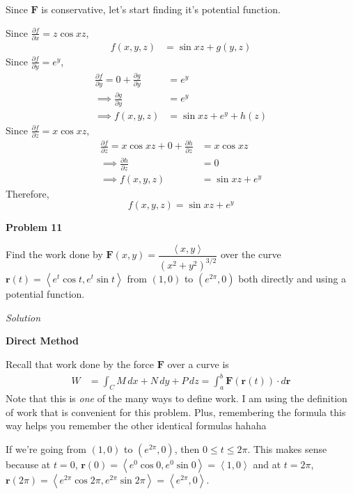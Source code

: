 \documentclass{article}
\newcommand{\lrp}[1]{\left( #1 \right)}
\newcommand{\lra}[1]{\left\langle #1 \right\rangle}
\renewcommand{\r}[0]{\mathbf{r}}
\newcommand{\F}[0]{\mathbf{F}}
\newcommand{\Solution}{\textit{Solution}}
\begin{document}
Since $\F$ is conservative, let's start finding it's potential function.

Since $\displaystyle \frac{\partial f}{\partial x}=z\cos xz$,
\begin{align*}
    f(x,y,z)&=\sin xz +g(y,z)
\end{align*}
Since $\displaystyle \frac{\partial f}{\partial y}=e^y$,
\begin{align*}
    \frac{\partial f}{\partial y}=0+\frac{\partial g}{\partial y}&=e^y\\
    \implies \frac{\partial g}{\partial y}&=e^y\\
    \implies f(x,y,z)&=\sin xz + e^y+h(z)
\end{align*}
Since $\displaystyle \frac{\partial f}{\partial z}=x\cos xz$,
\begin{align*}
    \frac{\partial f}{\partial z}=x\cos xz + 0 +\frac{\partial h}{\partial z}&=x\cos xz\\
    \implies \frac{\partial h}{\partial z}&=0\\
    \implies f(x,y,z)&=\sin xz + e^y\tag{let $C=0$ aka ignore $C$}
\end{align*}
Therefore,
\begin{equation*}
    \boxed{f(x,y,z)=\sin xz+e^y}
\end{equation*}
{}\textbf{Problem 11}

Find the work done by $\F(x,y)=\dfrac{\lra{x,y}}{(x^2+y^2)^{3/2}}$ over the curve $\r(t)=\lra{e^t\cos t,e^t\sin t}$ from $(1,0)$ to $\lrp{e^{2\pi},0}$ both directly and using a potential function.

\Solution

{} \textbf{Direct Method}

Recall that work done by the force $\F$ over a curve is
\begin{align*}
    W&=\int_C M\,dx + N\,dy + P\,dz=\int_a^b \F\lrp{\r(t)}\cdot d\r
\end{align*}
Note that this is \textit{one} of the many ways to define work. I am using the definition of work that is convenient for this problem. Plus, remembering the formula this way helps you remember the other identical formulas hahaha

If we're going from $(1,0)$ to $\lrp{e^{2\pi},0}$, then $0\leq t\leq 2\pi$. This makes sense because at $t=0$, $\r(0)=\lra{e^0\cos 0, e^0\sin 0}=\lra{1, 0}$ and at $t=2\pi$, $\r(2\pi)=\lra{e^{2\pi}\cos 2\pi, e^{2\pi}\sin 2\pi}=\lra{e^{2\pi},0}$.
\end{document}
